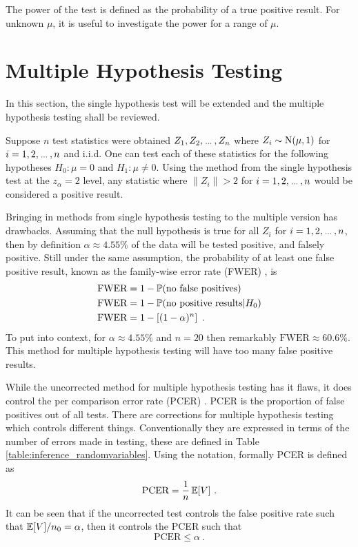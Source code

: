 The power of the test is defined as the probability of a true positive result. For unknown $\mu$, it is useful to investigate the power for a range of $\mu$.

\section{Multiple Hypothesis Testing}

In this section, the single hypothesis test will be extended and the multiple hypothesis testing \citep{shaffer1995multiple, dudoit2003multiple} shall be reviewed.

Suppose $n$ test statistics were obtained $Z_1,Z_2,\dotdotdot,Z_n$ where $Z_i\sim\operatorname{N}(\mu,1)$ for $i=1,2,\dotdotdot,n$ and i.i.d. One can test each of these statistics for the following hypotheses $H_0:\mu=0$ and $H_1:\mu\neq 0$. Using the method from the single hypothesis test at the $z_\alpha=2$ level, any statistic where $\|Z_i\|>2$ for $i=1,2,\dotdotdot,n$ would be considered a positive result.

Bringing in methods from single hypothesis testing to the multiple version has drawbacks. Assuming that the null hypothesis is true for all $Z_i$ for $i=1,2,\dotdotdot,n$, then by definition $\alpha\approx 4.55\%$ of the data will be tested positive, and falsely positive. Still under the same assumption, the probability of at least one false positive result, known as the family-wise error rate (FWER) \citep{shaffer1995multiple}, is
\begin{align}
    \text{FWER}&=1-\operatorname{\mathbb{P}}(\text{no false positives}) \nonumber\\
    \text{FWER}&=1-\operatorname{\mathbb{P}}(\text{no positive results}|H_0) \nonumber\\
    \text{FWER}&=1-\left[(1-\alpha)^n\right] \label{eq:inference_fwer}\ .
\end{align}
To put into context, for $\alpha\approx 4.55\%$ and $n=20$ then remarkably $\text{FWER}\approx60.6\%$. This method for multiple hypothesis testing will have too many false positive results.

While the uncorrected method for multiple hypothesis testing has it flaws, it does control the per comparison error rate (PCER) \citep{benjamini1995controlling}. PCER is the proportion of false positives out of all tests. There are corrections for multiple hypothesis testing which controls different things. Conventionally they are expressed in terms of the number of errors made in testing, these are defined in Table \ref{table:inference_randomvariables}. Using the notation, formally PCER is defined as
\begin{equation}
    \text{PCER}=
    \dfrac{
        1
    }
    {
        n
    }
    \operatorname{\mathbb{E}}[V]
    \ .
\end{equation}
It can be seen that if the uncorrected test controls the false positive rate such that $\operatorname{\mathbb{E}}[V]/n_0 = \alpha$, then it controls the PCER such that
\begin{equation}
    \text{PCER}\leqslant\alpha \ .
\end{equation}

